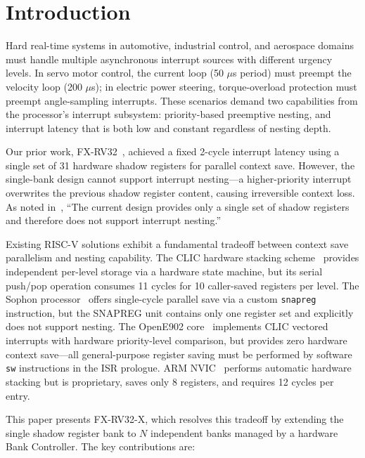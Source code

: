 \documentclass[conference]{IEEEtran}
\begin{document}
\section{Introduction}

Hard real-time systems in automotive, industrial control, and aerospace domains must handle multiple asynchronous interrupt sources with different urgency levels.
In servo motor control, the current loop (50 $\mu$s period) must preempt the velocity loop (200 $\mu$s); in electric power steering, torque-overload protection must preempt angle-sampling interrupts.
These scenarios demand two capabilities from the processor's interrupt subsystem: priority-based preemptive nesting, and interrupt latency that is both low and constant regardless of nesting depth.

Our prior work, FX-RV32~\cite{ref1}, achieved a fixed 2-cycle interrupt latency using a single set of 31 hardware shadow registers for parallel context save.
However, the single-bank design cannot support interrupt nesting---a higher-priority interrupt overwrites the previous shadow register content, causing irreversible context loss.
As noted in~\cite{ref1}, ``The current design provides only a single set of shadow registers and therefore does not support interrupt nesting.''

Existing RISC-V solutions exhibit a fundamental tradeoff between context save parallelism and nesting capability.
The CLIC hardware stacking scheme~\cite{ref2} provides independent per-level storage via a hardware state machine, but its serial push/pop operation consumes 11 cycles for 10 caller-saved registers per level.
The Sophon processor~\cite{ref3} offers single-cycle parallel save via a custom \texttt{snapreg} instruction, but the SNAPREG unit contains only one register set and explicitly does not support nesting.
The OpenE902 core~\cite{ref4} implements CLIC vectored interrupts with hardware priority-level comparison, but provides zero hardware context save---all general-purpose register saving must be performed by software \texttt{sw} instructions in the ISR prologue.
ARM NVIC~\cite{ref5} performs automatic hardware stacking but is proprietary, saves only 8 registers, and requires 12 cycles per entry.

This paper presents FX-RV32-X, which resolves this tradeoff by extending the single shadow register bank to $N$ independent banks managed by a hardware Bank Controller.
The key contributions are:
\end{document}
